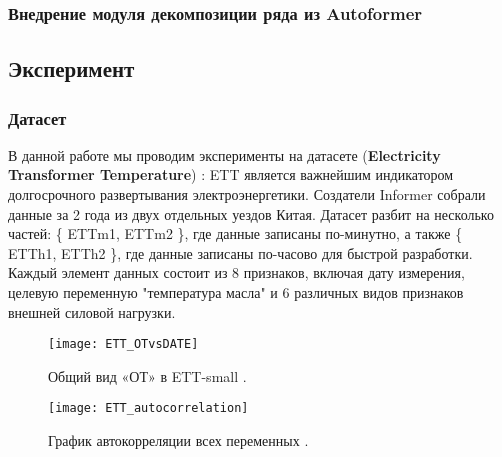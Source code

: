 \subsubsection{Внедрение модуля декомпозиции ряда из Autoformer}



\subsection{Эксперимент}

\subsubsection{Датасет}

В данной работе мы проводим эксперименты на датасете 
(\textbf{Electricity Transformer Temperature}) \cite{informer}:
ETT является важнейшим индикатором долгосрочного развертывания 
электроэнергетики. Создатели Informer собрали данные за 
2 года из двух отдельных уездов Китая. Датасет разбит на несколько 
частей: \{ ETTm1, ETTm2 \}, где данные записаны по-минутно, а 
также \{ ETTh1, ETTh2 \}, где данные записаны по-часово 
для быстрой разработки. Каждый элемент данных состоит из 
8 признаков, включая дату измерения, целевую переменную 
"температура масла" и 6 различных видов признаков внешней силовой 
нагрузки.  

\begin{figure}[h!]
    \centering
    \texttt{[image: ETT\_OTvsDATE]}
    \caption{Общий вид «ОТ» в ETT-small \cite{informer}.}
    \label{fig:ETT_OTvsDATE}
\end{figure}

\begin{figure}[h!]
    \centering
    \texttt{[image: ETT\_autocorrelation]}
    \caption{График автокорреляции всех переменных \cite{informer}.}
    \label{fig:ETT_autocorrelation}
\end{figure}

